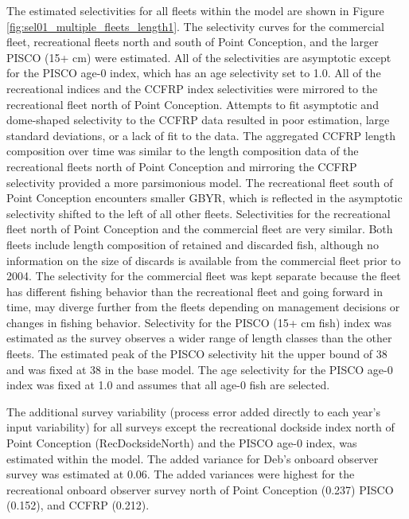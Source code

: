 \documentclass[12pt,]{article}
\begin{document}
The estimated selectivities for all fleets within the model are shown in
Figure \ref{fig:sel01_multiple_fleets_length1}. The selectivity curves
for the commercial fleet, recreational fleets north and south of Point
Conception, and the larger PISCO (15+ cm) were estimated. All of the
selectivities are asymptotic except for the PISCO age-0 index, which has
an age selectivity set to 1.0. All of the recreational indices and the
CCFRP index selectivities were mirrored to the recreational fleet north
of Point Conception. Attempts to fit asymptotic and dome-shaped
selectivity to the CCFRP data resulted in poor estimation, large
standard deviations, or a lack of fit to the data. The aggregated CCFRP
length composition over time was similar to the length composition data
of the recreational fleets north of Point Conception and mirroring the
CCFRP selectivity provided a more parsimonious model. The recreational
fleet south of Point Conception encounters smaller GBYR, which is
reflected in the asymptotic selectivity shifted to the left of all other
fleets. Selectivities for the recreational fleet north of Point
Conception and the commercial fleet are very similar. Both fleets
include length composition of retained and discarded fish, although no
information on the size of discards is available from the commercial
fleet prior to 2004. The selectivity for the commercial fleet was kept
separate because the fleet has different fishing behavior than the
recreational fleet and going forward in time, may diverge further from
the fleets depending on management decisions or changes in fishing
behavior. Selectivity for the PISCO (15+ cm fish) index was estimated as
the survey observes a wider range of length classes than the other
fleets. The estimated peak of the PISCO selectivity hit the upper bound
of 38 and was fixed at 38 in the base model. The age selectivity for the
PISCO age-0 index was fixed at 1.0 and assumes that all age-0 fish are
selected.

The additional survey variability (process error added directly to each
year's input variability) for all surveys except the recreational
dockside index north of Point Conception (RecDocksideNorth) and the
PISCO age-0 index, was estimated within the model. The added variance
for Deb's onboard observer survey was estimated at 0.06. The added
variances were highest for the recreational onboard observer survey
north of Point Conception (0.237) PISCO (0.152), and CCFRP (0.212).
\end{document}
